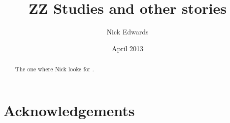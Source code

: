 \documentclass[a4paper]{report}
\begin{document}
\title{ZZ Studies and other stories}
\author{Nick Edwards}
\date{April 2013}

\maketitle

\tableofcontents
\listoffigures
\listoftables

\chapter*{Acknowledgements}

\begin{abstract}
The one where Nick looks for \ZZ.
\end{abstract}




























\end{document}
